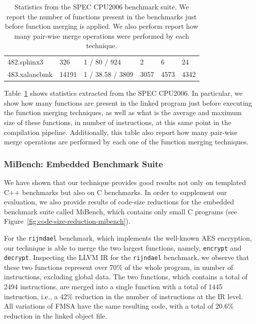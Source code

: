 \begin{table}[h]
{\begin{tabular}{llllll}
\rowcolor{evencolor} 482.sphinx3        & 326    & 1 / 80 / 924       & 2      & 6     & 24     \\
                     483.xalancbmk      & 14191  & 1 / 38.58 / 3809   & 3057   & 4573  & 4342   \\
\bottomrule
\end{tabular}
}
\caption{
Statistics from the SPEC CPU2006 benchmark suite.
We report the number of functions present in the benchmarks just before function merging is applied. We also perform report how many pair-wise merge operations were performed by
each technique.
}
\label{tab:stats}
\end{table}

Table~\ref{tab:stats} shows statistics extracted from the SPEC CPU2006.
In particular, we show how many functions are present in the linked program
just before executing the function merging techniques, as well as what is
the average and maximum size of these functions, in number of instructions, at
this same point in the compilation pipeline.
Additionally, this table also report how many pair-wise merge operations are
performed by each one of the function merging techniques.

\subsubsection{MiBench: Embedded Benchmark Suite}

We have shown that our technique provides good results not only on templated C++
benchmarks but also on C benchmarks.
In order to supplement our evaluation, we also provide results of code-size
reductions for the embedded benchmark suite called MiBench, which contains only
small C programs (see Figure~\ref{fig:code-size-reduction-mibench}).

For the \texttt{rijndael} benchmark, which implements the well-known AES
encryption, our technique is able to merge the two largest functions, namely,
\texttt{encrypt} and \texttt{decrypt}.
Inspecting the LLVM IR for the \texttt{rijndael} benchmark, we observe that
these two functions represent over 70\% of the whole program, in number of
instructions, excluding global data.
The two functions, which contains a total of 2494 instructions, are merged into
a single function with a total of 1445 instruction, i.e., a 42\% reduction in
the number of instructions at the IR level. All variations of FMSA have the same
resulting code, with a total of 20.6\% reduction in the linked object file.

